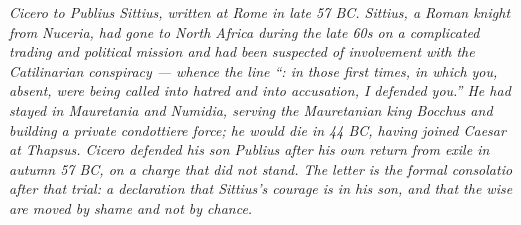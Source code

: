 
\textit{Cicero to Publius Sittius, written at Rome in late 57
BC. Sittius, a Roman knight from Nuceria, had gone to North
Africa during the late 60s on a complicated trading and
political mission and had been suspected of involvement with
the Catilinarian conspiracy --- whence the line
``: in those first times, in which you, absent,
were being called into hatred and into accusation, I
defended you.'' He had stayed in Mauretania and Numidia,
serving the Mauretanian king Bocchus and building a private
condottiere force; he would die in 44 BC, having joined
Caesar at Thapsus. Cicero defended his son Publius after his
own return from exile in autumn 57 BC, on a charge that did
not stand. The letter is the formal consolatio after that
trial: a declaration that Sittius's courage is in his son,
and that the wise are moved by shame and not by chance.}
